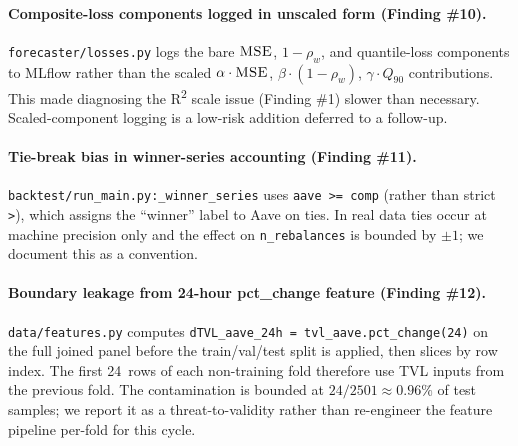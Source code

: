 \paragraph{Composite-loss components logged in unscaled form (Finding \#10).}
\texttt{forecaster/losses.py} logs the bare $\textsc{MSE}$,
$1 - \rho_{w}$, and quantile-loss components to MLflow rather than the
scaled $\alpha \cdot \textsc{MSE}$, $\beta \cdot (1 - \rho_w)$,
$\gamma \cdot Q_{90}$ contributions. This made diagnosing the R\textsuperscript{2}
scale issue (Finding \#1) slower than necessary. Scaled-component logging
is a low-risk addition deferred to a follow-up.

\paragraph{Tie-break bias in winner-series accounting (Finding \#11).}
\texttt{backtest/run\_main.py:\_winner\_series} uses
\texttt{aave >= comp} (rather than strict \texttt{>}), which assigns the
``winner'' label to Aave on ties. In real data ties occur at machine
precision only and the effect on \texttt{n\_rebalances} is bounded by
$\pm 1$; we document this as a convention.

\paragraph{Boundary leakage from 24-hour pct\_change feature (Finding \#12).}
\texttt{data/features.py} computes
\texttt{dTVL\_aave\_24h = tvl\_aave.pct\_change(24)} on the full joined
panel before the train/val/test split is applied, then slices by row
index. The first 24~rows of each non-training fold therefore use TVL
inputs from the previous fold. The contamination is bounded at
$24/2501 \approx 0.96\%$ of test samples; we report it as a
threat-to-validity rather than re-engineer the feature pipeline
per-fold for this cycle.
